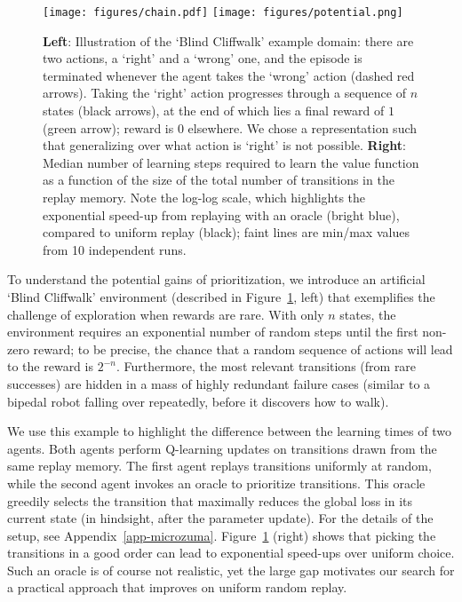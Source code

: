 \documentclass[a4paper]{article}
\begin{document}
\begin{figure}[tb]
\vspace{-1em}
\centerline{
\texttt{[image: figures/chain.pdf]}
\hspace{0.1\textwidth}
\texttt{[image: figures/potential.png]}
}
\vspace{-0.5em}
\caption{
\label{fig-microzuma-chain}
{\bf Left}: Illustration of the `Blind Cliffwalk' example domain: there are two actions, a `right' and a `wrong' one, 
and the episode is terminated whenever the agent takes the `wrong' action (dashed red arrows). 
Taking the `right' action progresses through a sequence of $n$ states (black arrows), at the end of which lies
a final reward of $1$ (green arrow); reward is $0$ elsewhere. We chose a representation such that generalizing over what action is `right' is not possible.
{\bf Right}: Median number of learning steps required to learn the value function as a function of the size of the total number of transitions in the replay memory. 
Note the log-log scale, which highlights the exponential speed-up from replaying with an oracle (bright blue), compared to uniform replay (black); faint lines are min/max values from 10 independent runs.
\vspace{-1em}
}
\end{figure}

To understand the potential gains of prioritization, we introduce an artificial `Blind Cliffwalk' environment (described in Figure~\ref{fig-microzuma-chain}, left)
that exemplifies the challenge of exploration when rewards
are rare.
With only $n$ states, the environment requires an exponential number of random steps until the first non-zero reward; 
to be precise, the chance that a random sequence of actions will lead to the reward is $2^{-n}$.
Furthermore, the most relevant transitions (from rare successes) 
are hidden in a mass of highly redundant failure cases (similar to a bipedal robot falling over repeatedly, before it discovers how to walk).

We use this example to highlight the difference between the learning times of two agents. Both agents perform Q-learning updates on transitions drawn from the same replay memory. The first agent replays transitions uniformly at random, while the second agent invokes an oracle to prioritize transitions. This oracle greedily selects the transition that maximally reduces the global loss in its current state (in hindsight, after the parameter update).
For the details of the setup, see Appendix~\ref{app-microzuma}.
Figure~\ref{fig-microzuma-chain} (right) shows that picking the transitions in a good order
can lead to exponential speed-ups over uniform choice.
Such an oracle is of course not realistic, yet the large gap motivates our search 
for a practical approach that improves on uniform random replay. 
\end{document}
